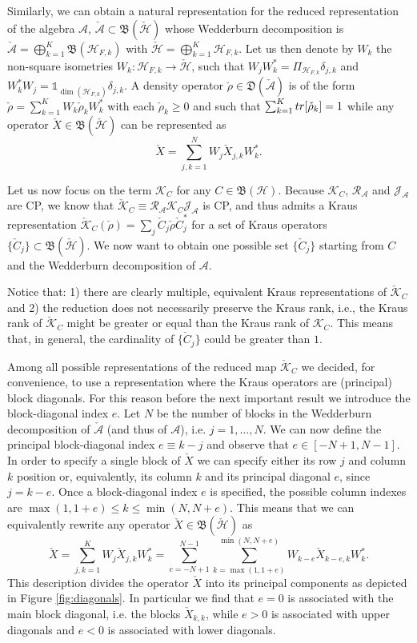 \documentclass[aihp,12pt]{imsart}
\newcommand{\Hc}{\mathcal{H}}
\newcommand{\Jc}{\mathcal{J}}
\newcommand{\Rc}{\mathcal{R}}
\newcommand{\Kc}{\mathcal{K}}
\newcommand{\As}{\mathscr{A}}
\newcommand{\Bf}{\mathfrak{B}}
\newcommand{\Df}{\mathfrak{D}}
\newcommand{\one}{\mathbb{1}}
\newcommand{\tr}{{\rm tr}}
\theoremstyle{theorem}
\theoremstyle{definition}
\theoremstyle{remark}
\begin{document}
Similarly, we can obtain a natural representation for the reduced representation of the algebra $\As$, $\check{\As}\subset\Bf(\check{\Hc})$ whose Wedderburn decomposition is $\check{\As} = \bigoplus_{k=1}^K \Bf(\Hc_{F,k})$ with $\check{\Hc} = \bigoplus_{k=1}^K \Hc_{F,k}$. Let us then denote by $W_k$ the non-square isometries $W_k:\Hc_{F,k}\to\check{\Hc}$, such that $W_j W_k^* = \Pi_{\Hc_{F,k}}\delta_{j,k}$ and $W_k^* W_j = \one_{\dim(\Hc_{F,k})}\delta_{j,k}$. A density operator $\check{\rho}\in\Df(\check{\As})$ is of the form $\check{\rho} = \sum_{k=1}^K W_k \check{\rho}_k W_k^*$ with each $\check{\rho}_k\geq0$ and such that $\sum_{k=1}^K\tr[\check{\rho}_k] = 1$ while any operator $\check{X}\in\Bf(\check{\Hc})$ can be represented as \[\check{X} = \sum_{j,k=1}^{N} W_j \check{X}_{j,k} W_k^*.\]

Let us now focus on the term $\Kc_{C}$ for any $C\in\Bf(\Hc)$.
Because $\Kc_C$, $\Rc_{\As}$ and $\Jc_\As$ are CP, we know that $\check{\Kc}_{C}\equiv \Rc_\As \Kc_C \Jc_\As$ is CP, and thus admits a Kraus representation $\check{\Kc}_C(\check{\rho}) = \sum_j \check{C}_j \check{\rho} \check{C}_j^*$ for a set of Kraus operators $\{\check{C}_j\}\subset\Bf(\check{\Hc})$. We now want to obtain one possible set $\{\check{C}_j\}$ starting from $C$ and the Wedderburn decomposition of $\As$.  

 Notice that: 1) there are clearly multiple, equivalent Kraus representations of $\check{\Kc}_C$ and 2) the reduction does not necessarily preserve the Kraus rank, i.e., the Kraus rank of $\check{\Kc}_C$ might be greater or equal than the Kraus rank of $\Kc_C$. This means that, in general, the cardinality of $\{\check{C}_j\}$ could be greater than $1$. 

Among all possible representations of the reduced map $\check{\Kc}_C$ we decided, for convenience, to use a representation where the Kraus operators are (principal) block diagonals. For this reason before the next important result we introduce the block-diagonal index $e$. Let $N$ be the number of blocks in the Wedderburn decomposition of $\check{\As}$ (and thus of $\As$), i.e. $j=1,\dots,N$. 
We can now define the principal block-diagonal index $e\equiv k-j$ and observe that $e\in[-N+1,N-1]$. 
In order to specify a single block of $\check{X}$ we can specify either its row $j$ and column $k$ position or, equivalently, its column $k$ and its principal diagonal $e$, since $j=k-e$. Once a block-diagonal index $e$ is specified, the possible column indexes are $\max(1,1+e)\leq k\leq\min(N,N+e)$.  
This means that we can equivalently rewrite any operator $\check{X}\in\Bf(\check{\Hc})$ as
\[\check{X} = \sum_{j,k=1}^K W_j \check{X}_{j,k} W_k^* = \sum_{e=-N+1}^{N-1} \sum_{k=\max(1,1+e)}^{\min(N,N+e)} W_{k-e} \check{X}_{k-e,k} W_{k}^*.\]
This description divides the operator $\check{X}$ into its principal components as depicted in Figure \ref{fig:diagonals}. In particular we find that $e=0$ is associated with the main block diagonal, i.e. the blocks $\check{X}_{k,k}$, while $e>0$ is associated with upper diagonals and $e<0$ is associated with lower diagonals.
\end{document}
